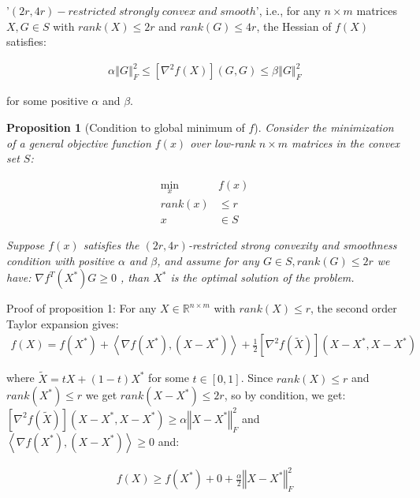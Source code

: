 \documentclass{article}
\newtheorem{proposition}{Proposition}
\begin{document}
'$(2r, 4r)-restricted\; strongly\; convex\; and\; smooth$', i.e., for any $n\times m$ matrices $X, G\in S$ with $rank(X) \le 2r$ and $rank(G) \le 4r$, the Hessian of $f(X)$ satisfies:

\begin{align}
\alpha\left\Vert G\right\Vert^2_F\le \left[\nabla^2f\left(X\right)\right]\left(G,G\right)\le \beta\left\Vert G\right\Vert^2_F
\end{align}

for some positive $\alpha$ and $\beta$.

\begin{proposition}[Condition to global minimum of $f$]
Consider the minimization of a general objective function $f\left(x\right)$ over low-rank $n\times m$ matrices in the convex set $S$:

\begin{align*}
    \min_{x} & f\left(x\right)\\
    rank\left(x\right) & \le r\\
    x & \in S
\end{align*}

Suppose $f\left(x\right)$ satisfies the $\left(2r,4r\right)$-restricted strong convexity and smoothness condition with positive $\alpha$ and $\beta$, and assume for any $G\in S,rank\left(G\right)\le2r$ we have: $\nabla f^{T}\left(X^{*}\right)G\ge0$ , than $X^{*}$ is the optimal solution of the problem.

\end{proposition}

Proof of proposition 1: For any $X\in\mathbb{R}^{n\times m}$ with $rank\left(X\right)\le r$, the second order Taylor expansion gives:
\begin{align*}
    f\left(X\right)=f\left(X^{*}\right)+\left\langle \nabla f\left(X^{*}\right),\left(X-X^{*}\right)\right\rangle +\frac{1}{2}\left[\nabla^{2}f\left(\widetilde{X}\right)\right]\left(X-X^{*},X-X^{*}\right)
\end{align*}

where $\widetilde{X}=tX+\left(1-t\right)X^{*}$ for some $t\in\left[0,1\right]$. Since $rank\left(X\right)\le r$ and $rank\left(X^{*}\right)\le r$ we get $rank\left(X-X^{*}\right)\le2r$, so by condition, we get: $\left[\nabla^{2}f\left(\widetilde{X}\right)\right]\left(X-X^{*},X-X^{*}\right)\ge\alpha\left\Vert X-X^{*}\right\Vert _{F}^{2}$ and $\left\langle \nabla f\left(X^{*}\right),\left(X-X^{*}\right)\right\rangle \ge0$ and:

\begin{align*}
    f\left(X\right)\ge f\left(X^{*}\right)+0+\frac{\alpha}{2}\left\Vert X-X^{*}\right\Vert _{F}^{2}
\end{align*}
\end{document}
